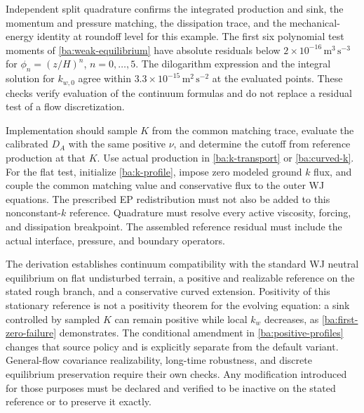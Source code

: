 \documentclass[11pt,a4paper]{article}
\numberwithin{equation}{section}
\begin{document}
Independent split quadrature confirms the integrated production and sink,
the momentum and pressure matching, the dissipation trace, and the
mechanical-energy identity at roundoff level for this example. The first
six polynomial test moments of \eqref{ba:weak-equilibrium} have absolute
residuals below $2\times10^{-16}\,\mathrm{m^3\,s^{-3}}$ for
$\phi_n=(z/H)^n$, $n=0,\ldots,5$.
The dilogarithm expression and the integral solution for $k_{w,0}$ agree
within $3.3\times10^{-15}\,\mathrm{m^2\,s^{-2}}$ at the evaluated points.
These checks verify evaluation of the continuum formulas and do not
replace a residual test of a flow discretization.

Implementation should sample $K$ from the common matching trace, evaluate
the calibrated $D_A$ with the same positive $\nu$, and determine the cutoff
from reference production at that $K$. Use actual production in
\eqref{ba:k-transport} or \eqref{ba:curved-k}. For the flat test,
initialize \eqref{ba:k-profile}, impose zero modeled ground $k$ flux,
and couple the common matching value and conservative flux to the outer
WJ equations. The prescribed EP redistribution must not also be added
to this nonconstant-$k$ reference. Quadrature must resolve every active
viscosity, forcing, and dissipation breakpoint. The assembled reference
residual must include the actual interface, pressure, and boundary operators.

The derivation establishes continuum compatibility with the standard WJ
neutral equilibrium on flat undisturbed terrain, a positive and realizable
reference on the stated rough branch, and a conservative curved extension.
Positivity of this stationary reference is not a positivity theorem for
the evolving equation: a sink controlled by sampled $K$ can remain positive
while local $k_w$ decreases, as \eqref{ba:first-zero-failure} demonstrates.
The conditional amendment in \eqref{ba:positive-profiles} changes that
source policy and is explicitly separate from the default variant.
General-flow covariance realizability,
long-time robustness, and discrete equilibrium preservation require their
own checks. Any modification introduced for those purposes must be
declared and verified to be inactive on the stated reference or to preserve
it exactly.
\end{document}
